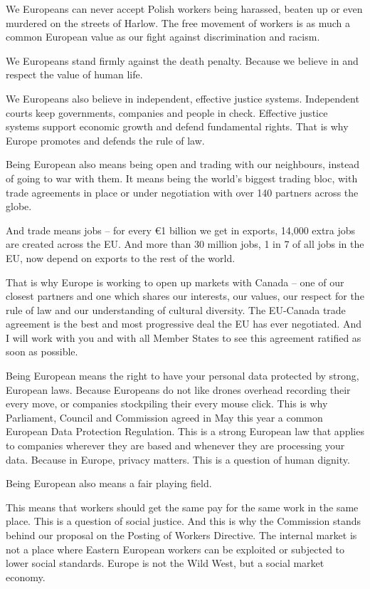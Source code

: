 \documentclass[a4paper,11pt]{article}
\begin{document}
We Europeans can never accept Polish workers being harassed, beaten up or even murdered on the streets of Harlow. The free movement of workers is as much a common European value as our fight against discrimination and racism.

We Europeans stand firmly against the death penalty. Because we believe in and respect the value of human life.

We Europeans also believe in independent, effective justice systems. Independent courts keep governments, companies and people in check. Effective justice systems support economic growth and defend fundamental rights. That is why Europe promotes and defends the rule of law.

Being European also means being open and trading with our neighbours, instead of going to war with them. It means being the world's biggest trading bloc, with trade agreements in place or under negotiation with over 140 partners across the globe.

And trade means jobs – for every \euro1 billion we get in exports, 14,000 extra jobs are created across the EU. And more than 30 million jobs, 1 in 7 of all jobs in the EU, now depend on exports to the rest of the world.

That is why Europe is working to open up markets with Canada – one of our closest partners and one which shares our interests, our values, our respect for the rule of law and our understanding of cultural diversity. The EU-Canada trade agreement is the best and most progressive deal the EU has ever negotiated. And I will work with you and with all Member States to see this agreement ratified as soon as possible.

Being European means the right to have your personal data protected by strong, European laws. Because Europeans do not like drones overhead recording their every move, or companies stockpiling their every mouse click. This is why Parliament, Council and Commission agreed in May this year a common European Data Protection Regulation. This is a strong European law that applies to companies wherever they are based and whenever they are processing your data. Because in Europe, privacy matters. This is a question of human dignity.

Being European also means a fair playing field.

This means that workers should get the same pay for the same work in the same place. This is a question of social justice. And this is why the Commission stands behind our proposal on the Posting of Workers Directive. The internal market is not a place where Eastern European workers can be exploited or subjected to lower social standards. Europe is not the Wild West, but a social market economy.
\end{document}
